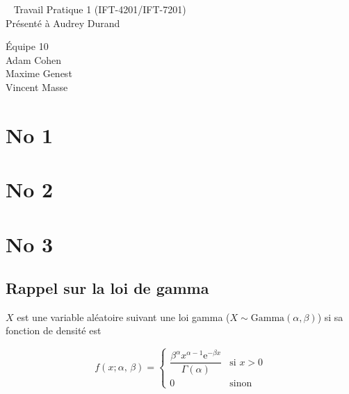 \documentclass[letterpaper,11pt]{article}
\renewcommand{\exp}[1]{\mathrm{e}^{#1}}
\begin{document}
\begin{center}
~
\vfill
\LARGE{Travail Pratique 1 (IFT-4201/IFT-7201)}\\[0.4cm]

\Large{Présenté à Audrey Durand}

\vfill
\large{Équipe 10 \\ Adam Cohen \\ Maxime Genest \\ Vincent Masse}

\vfill
\thispagestyle{empty}

\end{center}
\clearpage

\pagestyle{fancy}


%

\section{No 1}

\section{No 2}

\section{No 3}

\subsection{Rappel sur la loi de gamma}

$X$ est une variable aléatoire suivant une loi gamma ($X\sim\mathrm{Gamma}(\alpha,\beta)$) si sa fonction de densité est

\begin{equation}
f(x; \alpha,\,\beta) =  
\left\{
\begin{array}{cl}
\dfrac{\beta^{\alpha} x^{\alpha-1} \exp{-\beta x}}{\Gamma(\alpha)} & \text{si } x>0\\[0.4cm]
0 & \text{sinon}
\end{array}
\right.
\end{equation}
\end{document}

